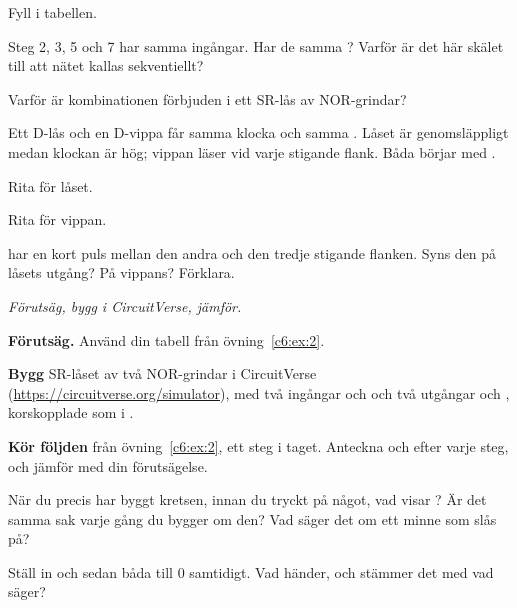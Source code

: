 \begin{parts}
  \item Fyll i tabellen.
  \item Steg 2, 3, 5 och 7 har samma ingångar. Har de samma ? Varför är det här skälet till
    att nätet kallas sekventiellt?
  \item Varför är kombinationen  förbjuden i ett SR-lås av NOR-grindar?
\end{parts}

\label{c6:ex:3}
Ett D-lås och en D-vippa får samma klocka och samma . Låset är genomsläppligt medan
klockan är hög; vippan läser  vid varje stigande flank. Båda börjar med .


\begin{parts}
  \item Rita  för låset.
  \item Rita  för vippan.
  \item {} har en kort puls mellan den andra och den tredje stigande flanken. Syns den på
    låsets utgång? På vippans? Förklara.
\end{parts}

\label{c6:ex:4}
\emph{Förutsäg, bygg i CircuitVerse, jämför.}
\begin{parts}
  \item \textbf{Förutsäg.} Använd din tabell från övning~\ref{c6:ex:2}.
  \item \textbf{Bygg} SR-låset av två NOR-grindar i CircuitVerse
    (\url{https://circuitverse.org/simulator}), med två ingångar  och  och två
    utgångar  och , korskopplade som i .
  \item \textbf{Kör följden} från övning~\ref{c6:ex:2}, ett steg i taget. Anteckna  och
     efter varje steg, och jämför med din förutsägelse.
  \item När du precis har byggt kretsen, innan du tryckt på något, vad visar ? Är det samma
    sak varje gång du bygger om den? Vad säger det om ett minne som slås på?
  \item Ställ in  och sedan båda till 0 samtidigt. Vad händer, och stämmer det med
    vad  säger?
\end{parts}

